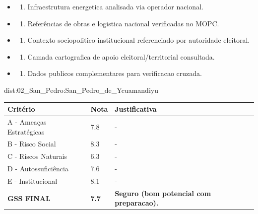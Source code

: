 {\begin{itemize}
\item
  \begin{enumerate}
  \def\labelenumi{\arabic{enumi})}
  \setcounter{enumi}{7}
  \tightlist
  \item
    Infraestrutura energetica analisada via operador nacional.
  \end{enumerate}
\item
  \begin{enumerate}
  \def\labelenumi{\arabic{enumi})}
  \setcounter{enumi}{8}
  \tightlist
  \item
    Referências de obras e logistica nacional verificadas no MOPC.
  \end{enumerate}
\item
  \begin{enumerate}
  \def\labelenumi{\arabic{enumi})}
  \setcounter{enumi}{9}
  \tightlist
  \item
    Contexto sociopolitico institucional referenciado por autoridade
    eleitoral.
  \end{enumerate}
\item
  \begin{enumerate}
  \def\labelenumi{\arabic{enumi})}
  \setcounter{enumi}{10}
  \tightlist
  \item
    Camada cartografica de apoio eleitoral/\allowbreak territorial consultada.
  \end{enumerate}
\item
  \begin{enumerate}
  \def\labelenumi{\arabic{enumi})}
  \setcounter{enumi}{11}
  \tightlist
  \item
    Dados publicos complementares para verificacao cruzada.
  \end{enumerate}
\end{itemize}}{dist:02_San_Pedro:San_Pedro_de_Ycuamandiyu}
\begin{table}[ht!]
\small \begin{tabular}{p{3.0cm}p{0.8cm}p{6.0cm}} \toprule
\textbf{Critério} & \textbf{Nota} & \textbf{Justificativa} \\ \midrule
A - Ameaças Estratégicas & 7.8 & - \\
B - Risco Social & 8.3 & - \\
C - Riscos Naturais & 6.3 & - \\
D - Autossuficiência & 7.6 & - \\
E - Institucional & 8.1 & - \\
\midrule \textbf{GSS FINAL} & \textbf{7.7} & \textbf{Seguro (bom potencial com preparacao).} \\ \bottomrule \end{tabular}
\end{table}
